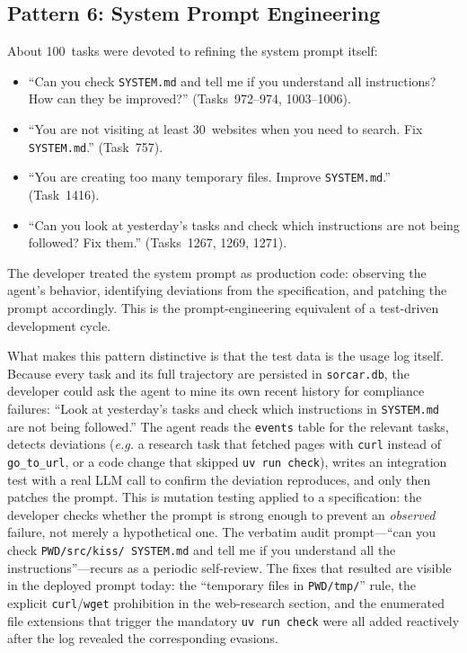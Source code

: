 \documentclass{article}
\newcommand{\eg}{\textit{e.g.}}
\begin{document}
\subsection{Pattern 6: System Prompt Engineering}
\label{sec:p-prompt}

About 100~tasks were devoted to refining the system prompt itself:

\begin{itemize}[nosep]
  \item ``Can you check \texttt{SYSTEM.md} and tell me if you
        understand all instructions?  How can they be improved?''
        (Tasks~972--974, 1003--1006).
  \item ``You are not visiting at least 30~websites when you need
        to search.  Fix \texttt{SYSTEM.md}.''
        (Task~757).
  \item ``You are creating too many temporary files.  Improve
        \texttt{SYSTEM.md}.''
        (Task~1416).
  \item ``Can you look at yesterday's tasks and check which
        instructions are not being followed?  Fix them.''
        (Tasks~1267, 1269, 1271).
\end{itemize}

The developer treated the system prompt as production code:
observing the agent's behavior, identifying deviations from the
specification, and patching the prompt accordingly.
This is the prompt-engineering equivalent of a test-driven
development cycle.

What makes this pattern distinctive is that the test data is the
usage log itself.
Because every task and its full trajectory are persisted in
\texttt{sorcar.db}, the developer could ask the agent to mine its own
recent history for compliance failures: ``Look at yesterday's tasks
and check which instructions in \texttt{SYSTEM.md} are not being
followed.''
The agent reads the \texttt{events} table for the relevant tasks,
detects deviations (\eg{} a research task that fetched pages with
\texttt{curl} instead of \texttt{go\_to\_url}, or a code change that
skipped \texttt{uv run check}), writes an integration test with a
real LLM call to confirm the deviation reproduces, and only then
patches the prompt.
This is mutation testing applied to a specification: the developer
checks whether the prompt is strong enough to prevent an
\emph{observed} failure, not merely a hypothetical one.
The verbatim audit prompt---``can you check \texttt{PWD/src/kiss/
SYSTEM.md} and tell me if you understand all the instructions''---recurs
as a periodic self-review.
The fixes that resulted are visible in the deployed prompt today: the
``temporary files in \texttt{PWD/tmp/}'' rule, the explicit
\texttt{curl}/\texttt{wget} prohibition in the web-research section,
and the enumerated file extensions that trigger the mandatory
\texttt{uv run check} were all added reactively after the log revealed
the corresponding evasions.
\end{document}
